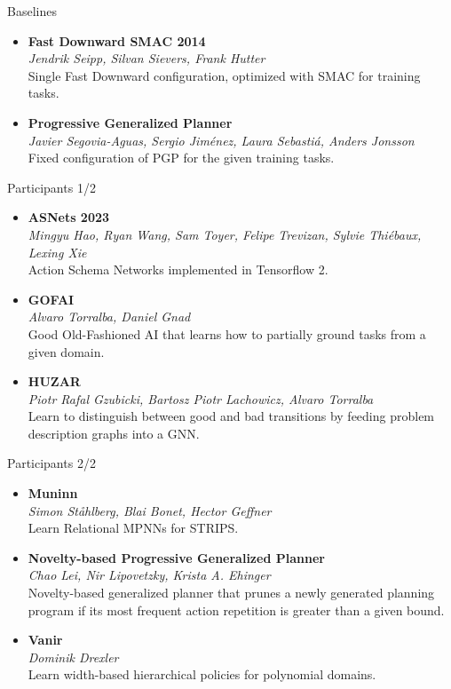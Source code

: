 \documentclass[aspectratio=169,xcolor=dvipsnames]{beamer}
\begin{document}
\begin{frame}{Baselines}
\begin{itemize}
\item
    \textbf{Fast Downward SMAC 2014}\\
    \emph{Jendrik Seipp, Silvan Sievers, Frank Hutter}\\
    Single Fast Downward
    configuration, optimized with SMAC for training tasks.
\item
    \textbf{Progressive Generalized Planner}\\
    \emph{Javier
    Segovia-Aguas, Sergio Jiménez, Laura Sebastiá, Anders Jonsson}\\
    Fixed configuration of PGP for the given training tasks.
\end{itemize}
\end{frame}

\begin{frame}{Participants 1/2}
\begin{itemize}
\item
    \textbf{ASNets 2023}\\
    \emph{Mingyu Hao, Ryan Wang, Sam Toyer, Felipe Trevizan, Sylvie
    Thiébaux, Lexing Xie}\\
    Action Schema Networks implemented in Tensorflow 2.
\item
    \textbf{GOFAI}\\
    \emph{Alvaro Torralba, Daniel Gnad}\\
    Good Old-Fashioned AI that learns
    how to partially ground tasks from a given domain.
\item
    \textbf{HUZAR}\\
    \emph{Piotr Rafal Gzubicki, Bartosz Piotr Lachowicz, Alvaro Torralba}\\
    Learn to distinguish between good and bad transitions by feeding
    problem description graphs into a GNN.
\end{itemize}
\end{frame}

\begin{frame}{Participants 2/2}
\begin{itemize}
\item
    \textbf{Muninn}\\
    \emph{Simon Ståhlberg, Blai Bonet, Hector Geffner}\\
    Learn Relational MPNNs for STRIPS.
\item
    \textbf{Novelty-based Progressive Generalized Planner}\\
    \emph{Chao Lei, Nir Lipovetzky, Krista A. Ehinger}\\
    Novelty-based generalized planner that
    prunes a newly generated planning program if its most frequent action
    repetition is greater than a given bound.
\item
    \textbf{Vanir}\\
    \emph{Dominik Drexler}\\
    Learn width-based hierarchical policies for
    polynomial domains.
\end{itemize}
\end{frame}
\end{document}
